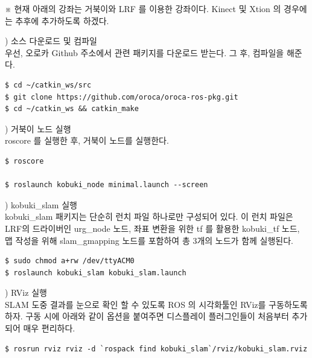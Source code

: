 ※ 현재 아래의 강좌는 거북이와 LRF 를 이용한 강좌이다. Kinect 및 Xtion 의 경우에는 추후에 추가하도록 하겠다.

\setcounter{num}{0}

\vspace{\baselineskip}
\noindent
{}
\thenum) 소스 다운로드 및 컴파일\\
우선, 오로카 Github 주소에서 관련 패키지를 다운로드 받는다. 그 후, 컴파일을 해준다.
\vspace{\baselineskip}
\begin{lstlisting}[language=ROS]
$ cd ~/catkin_ws/src
$ git clone https://github.com/oroca/oroca-ros-pkg.git
$ cd ~/catkin_ws && catkin_make
\end{lstlisting}

\vspace{\baselineskip}
\noindent
{}
\thenum) 거북이 노드 실행\\
roscore 를 실행한 후, 거북이 노드를 실행한다.

\vspace{\baselineskip}
\begin{lstlisting}[language=ROS]
$ roscore

$ roslaunch kobuki_node minimal.launch --screen
\end{lstlisting}

\vspace{\baselineskip}
\noindent
{}
\thenum) kobuki\_slam 실행\\
kobuki\_slam 패키지는 단순히 런치 파일 하나로만 구성되어 있다. 이 런치 파일은 LRF의 드라이버인 urg\_node 노드, 좌표 변환을 위한 tf 를 활용한 kobuki\_tf 노드, 맵 작성을 위해 slam\_gmapping 노드를 포함하여 총 3개의 노드가 함께 실행된다.
\vspace{\baselineskip}
\begin{lstlisting}[language=ROS]
$ sudo chmod a+rw /dev/ttyACM0
$ roslaunch kobuki_slam kobuki_slam.launch
\end{lstlisting}

\vspace{\baselineskip}
\noindent
{}
\thenum) RViz 실행\\
SLAM 도중 결과를 눈으로 확인 할 수 있도록 ROS 의 시각화툴인 RViz를 구동하도록 하자. 구동 시에 아래와 같이 옵션을 붙여주면 디스플레이 플러그인들이 처음부터 추가되어 매우 편리하다.
\vspace{\baselineskip}
\begin{lstlisting}[language=ROS]
$ rosrun rviz rviz -d `rospack find kobuki_slam`/rviz/kobuki_slam.rviz
\end{lstlisting}

